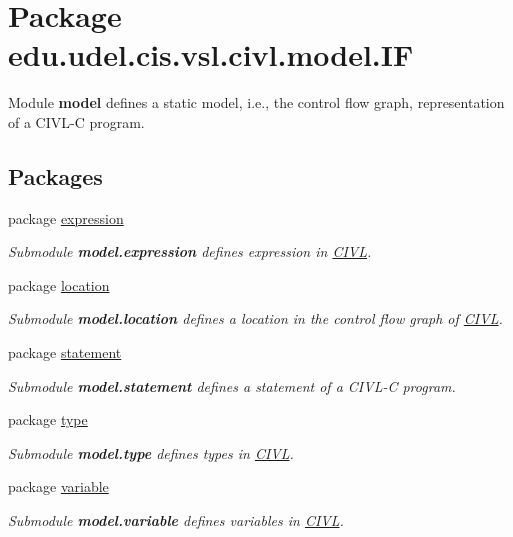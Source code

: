 \hypertarget{namespaceedu_1_1udel_1_1cis_1_1vsl_1_1civl_1_1model_1_1IF}{}\section{Package edu.\+udel.\+cis.\+vsl.\+civl.\+model.\+I\+F}
\label{namespaceedu_1_1udel_1_1cis_1_1vsl_1_1civl_1_1model_1_1IF}


Module {\bfseries model} defines a static model, i.\+e., the control flow graph, representation of a C\+I\+V\+L-\/\+C program.  


\subsection*{Packages}
\begin{DoxyCompactItemize}
\item 
package \hyperlink{namespaceedu_1_1udel_1_1cis_1_1vsl_1_1civl_1_1model_1_1IF_1_1expression}{expression}
\begin{DoxyCompactList}\small\item\em Submodule {\bfseries model.\+expression} defines expression in \hyperlink{classedu_1_1udel_1_1cis_1_1vsl_1_1civl_1_1CIVL}{C\+I\+V\+L}. \end{DoxyCompactList}\item 
package \hyperlink{namespaceedu_1_1udel_1_1cis_1_1vsl_1_1civl_1_1model_1_1IF_1_1location}{location}
\begin{DoxyCompactList}\small\item\em Submodule {\bfseries model.\+location} defines a location in the control flow graph of \hyperlink{classedu_1_1udel_1_1cis_1_1vsl_1_1civl_1_1CIVL}{C\+I\+V\+L}. \end{DoxyCompactList}\item 
package \hyperlink{namespaceedu_1_1udel_1_1cis_1_1vsl_1_1civl_1_1model_1_1IF_1_1statement}{statement}
\begin{DoxyCompactList}\small\item\em Submodule {\bfseries model.\+statement} defines a statement of a C\+I\+V\+L-\/\+C program. \end{DoxyCompactList}\item 
package \hyperlink{namespaceedu_1_1udel_1_1cis_1_1vsl_1_1civl_1_1model_1_1IF_1_1type}{type}
\begin{DoxyCompactList}\small\item\em Submodule {\bfseries model.\+type} defines types in \hyperlink{classedu_1_1udel_1_1cis_1_1vsl_1_1civl_1_1CIVL}{C\+I\+V\+L}. \end{DoxyCompactList}\item 
package \hyperlink{namespaceedu_1_1udel_1_1cis_1_1vsl_1_1civl_1_1model_1_1IF_1_1variable}{variable}
\begin{DoxyCompactList}\small\item\em Submodule {\bfseries model.\+variable} defines variables in \hyperlink{classedu_1_1udel_1_1cis_1_1vsl_1_1civl_1_1CIVL}{C\+I\+V\+L}. \end{DoxyCompactList}\end{DoxyCompactItemize}
